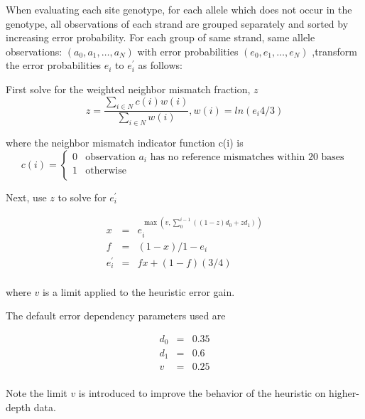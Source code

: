 \documentclass{article}
\begin{document}
When evaluating each site genotype, for each allele which does not occur in the genotype, all observations of each strand are grouped separately and sorted by increasing error probability. For each group of same strand, same allele observations: $(a_0,a_1,\ldots,a_N)$ with error probabilities $(e_0,e_1,\ldots,e_N)$ ,transform the error probabilities $e_i$ to $e^{\prime}_i$ as follows:

First solve for the weighted neighbor mismatch fraction, $z$
\begin{equation*}
z = \frac{\sum_{i \in N}{c(i)w(i)}}{\sum_{i \in N}{w(i)}},w(i) = ln (e_i 4/3)
\end{equation*}

where the neighbor mismatch indicator function c(i) is
\begin{equation*}
c(i) =
\begin{cases}
0 & \text{observation $a_i$ has no reference mismatches within 20 bases} \\
1 & \text{otherwise} \\
\end{cases}
\end{equation*}

Next, use $z$ to solve for $e^{\prime}_i$

\begin{equation*}
\begin{array}{lcl}
    x & = & e^{\max(v, \sum_{0}^{i-1}{((1-z)d_0+zd_1)})}_i \\
    f & = & (1-x)/1-e_i \\
    e^{\prime}_i & = & fx + (1-f)(3/4) \\
\end{array}
\end{equation*}

where $v$ is a limit applied to the heuristic error gain.

The default error dependency parameters used are

\begin{equation*}
\begin{array}{lcl}
d_0 & = & 0.35 \\
d_1 & = & 0.6 \\
v & = & 0.25 \\
\end{array}
\end{equation*}

Note the limit $v$ is introduced to improve the behavior of the heuristic on higher-depth data.

\end{document}
